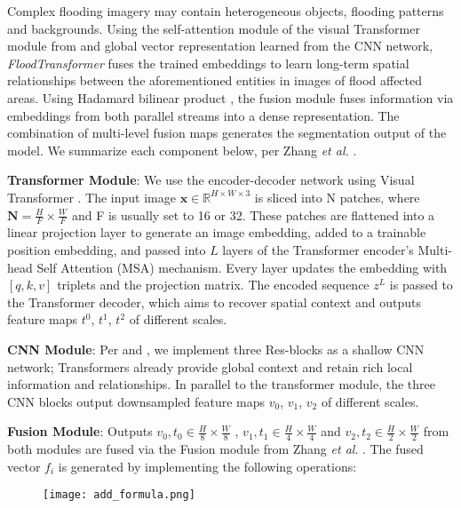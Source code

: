 \documentclass{article}
\begin{document}
Complex flooding imagery may contain heterogeneous objects, flooding patterns and backgrounds. Using the self-attention module of the visual Transformer module from  \cite{zhou2021deepvit} and global vector representation learned from the CNN network, \textit{FloodTransformer} fuses the trained embeddings to learn long-term spatial relationships between the aforementioned entities in images of flood affected areas. Using Hadamard bilinear product \cite{zhang2021transfuse}, the fusion module fuses information via embeddings from both parallel streams into a dense representation. The combination of multi-level fusion maps generates the segmentation output of the model. We summarize each component below, per Zhang \textit{et al.} \cite{zhang2021transfuse}. 

\textbf{Transformer Module}:
We use the encoder-decoder network using Visual Transformer \cite{zhou2021deepvit}. The input image $\mathbf{x} \in \mathbb{R}^{H \times W \times 3}$ is sliced into N patches, where $\mathbf{N} = {\frac{H}{F} \times \frac{W}{F} }$ and F is usually set to 16 or 32. These patches are flattened into a linear projection layer to generate an image embedding, added to a trainable position embedding, and passed into $L$ layers of the Transformer encoder's Multi-head Self Attention (MSA) mechanism. Every layer updates the embedding with $[q, k, v]$ triplets and the projection matrix. The encoded sequence $z^{L}$ is passed to the Transformer decoder, which aims to recover spatial context and outputs feature maps $t^{0}$, $t^{1}$, $t^{2}$ of different scales.

\textbf{CNN Module}: Per \cite{zhang2021transfuse} and \cite{roytowards}, we implement three Res-blocks as a shallow CNN network; Transformers already provide global context and retain rich local information and relationships. In parallel to the transformer module, the three CNN blocks output downsampled feature maps $v_{0}$, $ v_{1}$, $ v_{2}$ of different scales.  

\textbf{Fusion Module}:
Outputs $ v_{0},t_{0} \in \frac{H}{8} \times \frac{W}{8}$ , $v_{1}, t_{1} \in \frac{H}{4} \times \frac{W}{4}$ and $v_{2}, t_{2} \in \frac{H}{2} \times \frac{W}{2}$ from both modules are fused via the Fusion module from Zhang \textit {et al}. \cite{zhang2021transfuse}. The fused vector $f_{i}$ is generated by implementing the following operations: 


\begin{figure}[ht]
    \centering

    {{\texttt{[image: add\_formula.png]}}}\enskip
\label{fig:addImage}\end{figure}
\end{document}
